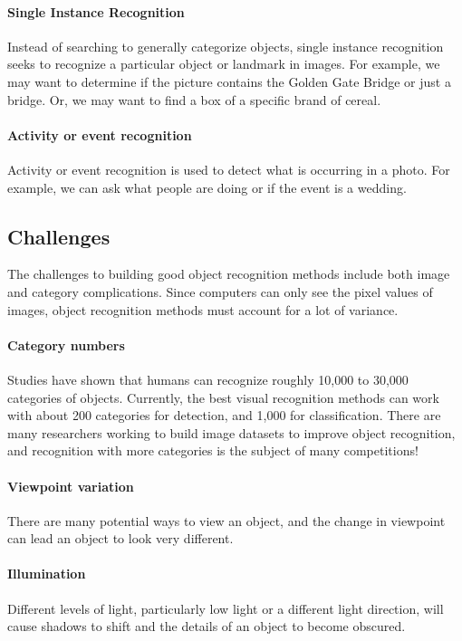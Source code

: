\documentclass{article}
\begin{document}
\paragraph{Single Instance Recognition}
Instead of searching to generally categorize objects, single instance recognition seeks to recognize a particular object or landmark in images. For example, we may want to determine if the picture contains the Golden Gate Bridge or just a bridge. Or, we may want to find a box of a specific brand of cereal.

\paragraph{Activity or event recognition} Activity or event recognition is used to detect what is occurring in a photo. For example, we can ask what people are doing or if the event is a wedding.

\subsection{Challenges}
The challenges to building good object recognition methods include both image and category complications. Since computers can only see the pixel values of images, object recognition methods must account for a lot of variance.

\paragraph{Category numbers}
Studies have shown that humans can recognize roughly 10,000 to 30,000 categories of objects. Currently, the best visual recognition methods can work with about 200 categories for detection, and 1,000 for classification. There are many researchers working to build image datasets to improve object recognition, and recognition with more categories is the subject of many competitions!

\paragraph{Viewpoint variation} There are many potential ways to view an object, and the change in viewpoint can lead an object to look very different.

\paragraph{Illumination} Different levels of light, particularly low light or a different light direction, will cause shadows to shift and the details of an object to become obscured.
\end{document}
